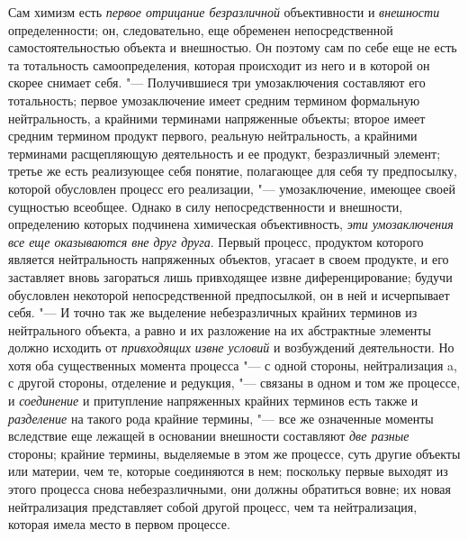 Сам химизм есть {\em первое
отрицание безразличной} объективности и
{\em внешности}
определенности; он, следовательно, еще обременен
непосредственной самостоятельностью объекта и внешностью. Он поэтому сам по
себе еще не есть та тотальность самоопределения, которая происходит из него
и в которой он скорее снимает себя. "--- Получившиеся три
умозаключения составляют его тотальность; первое умозаключение имеет
средним термином формальную нейтральность, а крайними терминами напряженные
объекты; второе имеет средним термином продукт первого, реальную
нейтральность, а крайними терминами расщепляющую деятельность и ее продукт,
безразличный элемент; третье же есть реализующее себя понятие, полагающее
для себя ту предпосылку, которой обусловлен процесс его реализации, "---
умозаключение, имеющее своей сущностью всеобщее. Однако в
силу непосредственности и внешности, определению которых подчинена
химическая объективность, {\em эти
умозаключения все еще оказываются вне друг друга}. Первый
процесс, продуктом которого является нейтральность напряженных объектов,
угасает в своем продукте, и его заставляет вновь загораться лишь
привходящее извне диференцирование; будучи обусловлен некоторой
непосредственной предпосылкой, он в ней и исчерпывает себя. "---
И точно так же выделение небезразличных крайних терминов из
нейтрального объекта, а равно и их разложение на их абстрактные элементы
должно исходить от {\em привходящих
извне условий} и возбуждений деятельности. Но хотя оба
существенных момента процесса "--- с одной стороны,
нейтрализация a, с другой стороны, отделение и редукция, "---
связаны в одном и том же процессе, и
{\em соединение} и
притупление напряженных крайних терминов есть также и
{\em разделение} на
такого рода крайние термины, "--- все же означенные моменты
вследствие еще лежащей в основании внешности составляют
{\em две разные} стороны;
крайние термины, выделяемые в этом же процессе, суть другие объекты или
материи, чем те, которые соединяются в нем; поскольку первые выходят из
этого процесса снова небезразличными, они должны обратиться
вовне; их новая нейтрализация представляет собой другой процесс, чем та
нейтрализация, которая имела место в первом процессе.

